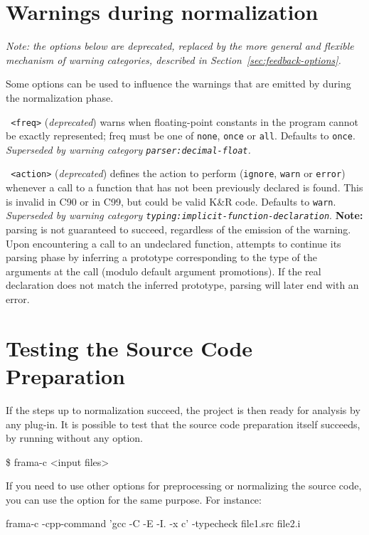 \section{Warnings during normalization}\label{sec:warnings-normalize}

\emph{Note: the options below are deprecated, replaced by the more general and
  flexible mechanism of \emph{warning categories}, described in
  Section~\ref{sec:feedback-options}.}

Some options can be used to influence the warnings that are
emitted by \FramaC during the normalization phase.

\begin{description}
\item \texttt{ <freq>}
  (\emph{deprecated}) warns
  when floating-point constants in the program cannot be exactly represented;
  freq must be one of \texttt{none}, \texttt{once} or \texttt{all}.
  Defaults to \texttt{once}.
  \emph{Superseded by warning category \texttt{parser:decimal-float}.}

\item \texttt{ <action>}
  (\emph{deprecated}) defines
  the action to perform (\texttt{ignore}, \texttt{warn} or \texttt{error})
  whenever a call to a function that has not been previously declared is found.
  This is invalid in C90 or in C99, but could be valid K\&R code.
  Defaults to \texttt{warn}.
  \emph{Superseded by warning category \texttt{typing:implicit-function-declaration}}.
  \textbf{Note:} parsing is not guaranteed to succeed, regardless of
  the emission of the warning. Upon encountering a call to an undeclared
  function, \FramaC attempts to continue its parsing
  phase by inferring a prototype corresponding to the type of the
  arguments at the call (modulo default argument promotions).
  If the real declaration does not match the
  inferred prototype, parsing will later end with an error.
\end{description}

\section{Testing the Source Code Preparation}

If the steps up to normalization succeed, the project is then ready for
analysis by any \FramaC plug-in. It is possible to test that the source code
preparation itself succeeds, by running \FramaC without any option.
\begin{shell}
\$ frama-c <input files>
\end{shell}

If you need to use other options for preprocessing or normalizing the source
code, you can use the option  for
the same purpose. For instance:
\begin{shell}
frama-c -cpp-command 'gcc -C -E -I. -x c' -typecheck file1.src file2.i
\end{shell}


